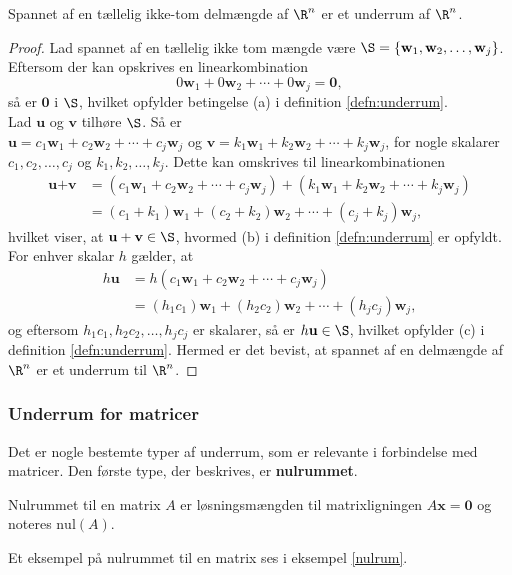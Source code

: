 \begin{thm}{}{}
Spannet af en tællelig ikke-tom delmængde af $\R^n$ er et underrum af $\R^n$.
\end{thm}
\begin{proof}
Lad spannet af en tællelig ikke tom mængde være 
$\S=\{\textbf{w}_1 , \textbf{w}_2 , \ldots , \textbf{w}_j\}$.
Eftersom der kan opskrives en linearkombination $$0\textbf{w}_1 + 0\textbf{w}_2 + \cdots + 0\textbf{w}_j=\textbf{0},$$ så er $\textbf{0}$ i  $\S$, hvilket opfylder betingelse (a) i definition \ref{defn:underrum}.\\
Lad $\textbf{u}$ og $\textbf{v}$ tilhøre $\S$. Så er\\
$\textbf{u}=c_1\textbf{w}_1+c_2\textbf{w}_2+\cdots+c_j\textbf{w}_j$ og $\textbf{v}=k_1\textbf{w}_1+k_2\textbf{w}_2+\cdots+k_j\textbf{w}_j$, for nogle skalarer $c_1,c_2,\ldots,c_j$ og $k_1,k_2,\ldots,k_j$. Dette kan omskrives til linearkombinationen
\begin{align*}
\textbf{u}+\textbf{v}&=(c_1\textbf{w}_1+c_2\textbf{w}_2+\cdots+c_j\textbf{w}_j)+(k_1\textbf{w}_1+k_2\textbf{w}_2+\cdots+k_j\textbf{w}_j)\\
&=(c_1+k_1)\textbf{w}_1+(c_2+k_2)\textbf{w}_2+\cdots+(c_j+k_j)\textbf{w}_j,
\end{align*}
hvilket viser, at $\textbf{u}+\textbf{v}\in \S$, hvormed (b) i definition \ref{defn:underrum} er opfyldt.\\
For enhver skalar $h$ gælder, at
\begin{align*}
h\textbf{u}&=h(c_1\textbf{w}_1+c_2\textbf{w}_2+\cdots+c_j\textbf{w}_j)\\
&=(h_1c_1)\textbf{w}_1+(h_2c_2)\textbf{w}_2+\cdots+(h_jc_j)\textbf{w}_j,
\end{align*}
og eftersom $h_1c_1,h_2c_2,\ldots,h_jc_j$ er skalarer, så er $h\textbf{u}\in \S$, hvilket opfylder (c) i definition \ref{defn:underrum}.
Hermed er det bevist, at spannet af en delmængde af $\R^n$ er et underrum til $\R^n$.
\end{proof}

\subsubsection{Underrum for matricer}
Det er nogle bestemte typer af underrum, som er relevante i forbindelse med matricer. Den første type, der beskrives, er \textbf{nulrummet}.
\begin{defn}{}{}
Nulrummet til en matrix $A$ er løsningsmængden til matrixligningen $A\textbf{x}=\textbf{0}$ og noteres $\text{nul}(A)$. 
\end{defn}
Et eksempel på nulrummet til en matrix ses i eksempel \ref{nulrum}.


